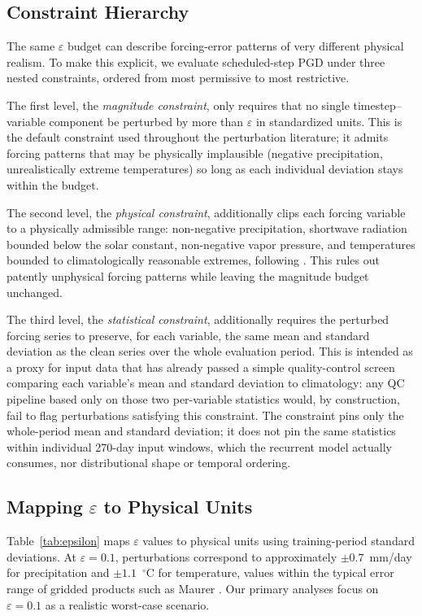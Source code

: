 \documentclass[final]{agujournal2019}
\begin{document}
\subsection{Constraint Hierarchy}

The same $\varepsilon$ budget can describe forcing-error patterns of very different physical realism. To make this explicit, we evaluate scheduled-step PGD under three nested constraints, ordered from most permissive to most restrictive.

The first level, the \textit{magnitude constraint}, only requires that no single timestep--variable component be perturbed by more than $\varepsilon$ in standardized units. This is the default constraint used throughout the perturbation literature; it admits forcing patterns that may be physically implausible (negative precipitation, unrealistically extreme temperatures) so long as each individual deviation stays within the budget.

The second level, the \textit{physical constraint}, additionally clips each forcing variable to a physically admissible range: non-negative precipitation, shortwave radiation bounded below the solar constant, non-negative vapor pressure, and temperatures bounded to climatologically reasonable extremes, following . This rules out patently unphysical forcing patterns while leaving the magnitude budget unchanged.

The third level, the \textit{statistical constraint}, additionally requires the perturbed forcing series to preserve, for each variable, the same mean and standard deviation as the clean series over the whole evaluation period. This is intended as a proxy for input data that has already passed a simple quality-control screen comparing each variable's mean and standard deviation to climatology: any QC pipeline based only on those two per-variable statistics would, by construction, fail to flag perturbations satisfying this constraint. The constraint pins only the whole-period mean and standard deviation; it does not pin the same statistics within individual 270-day input windows, which the recurrent model actually consumes, nor distributional shape or temporal ordering.

\subsection{Mapping $\varepsilon$ to Physical Units}

Table~\ref{tab:epsilon} maps $\varepsilon$ values to physical units using training-period standard deviations. At $\varepsilon = 0.1$, perturbations correspond to approximately $\pm 0.7$~mm/day for precipitation and $\pm 1.1$~$^\circ$C for temperature, values within the typical error range of gridded products such as Maurer \cite{Maurer2002, Thornton2021}. Our primary analyses focus on $\varepsilon = 0.1$ as a realistic worst-case scenario.
\end{document}
